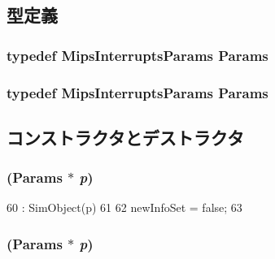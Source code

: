 \subsection{型定義}
\hypertarget{classMipsISA_1_1Interrupts_a2d2df962f437c169ec932010a88ab884}{
\subsubsection[{Params}]{\setlength{\rightskip}{0pt plus 5cm}typedef MipsInterruptsParams {\bf Params}}}
\label{classMipsISA_1_1Interrupts_a2d2df962f437c169ec932010a88ab884}
\hypertarget{classMipsISA_1_1Interrupts_a2d2df962f437c169ec932010a88ab884}{
\subsubsection[{Params}]{\setlength{\rightskip}{0pt plus 5cm}typedef MipsInterruptsParams {\bf Params}}}
\label{classMipsISA_1_1Interrupts_a2d2df962f437c169ec932010a88ab884}


\subsection{コンストラクタとデストラクタ}
\hypertarget{classMipsISA_1_1Interrupts_a3d148759405b99148e0c34750966edb1}{
\subsubsection[{Interrupts}]{ ({\bf Params} $\ast$ {\em p})}}
\label{classMipsISA_1_1Interrupts_a3d148759405b99148e0c34750966edb1}



\begin{DoxyCode}
60                            : SimObject(p)
61     {
62         newInfoSet = false;
63     }
\end{DoxyCode}
\hypertarget{classMipsISA_1_1Interrupts_a3d148759405b99148e0c34750966edb1}{
\subsubsection[{Interrupts}]{ ({\bf Params} $\ast$ {\em p})}}
\label{classMipsISA_1_1Interrupts_a3d148759405b99148e0c34750966edb1}



